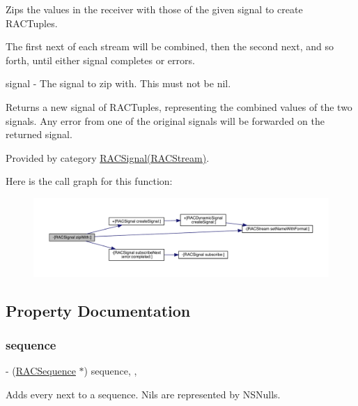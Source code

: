Zips the values in the receiver with those of the given signal to create R\+A\+C\+Tuples.

The first {\ttfamily next} of each stream will be combined, then the second {\ttfamily next}, and so forth, until either signal completes or errors.

signal -\/ The signal to zip with. This must not be {\ttfamily nil}.

Returns a new signal of R\+A\+C\+Tuples, representing the combined values of the two signals. Any error from one of the original signals will be forwarded on the returned signal. 

Provided by category \mbox{\hyperlink{category_r_a_c_signal_07_r_a_c_stream_08_ac822f657df311327de76bc55bcae689d}{R\+A\+C\+Signal(\+R\+A\+C\+Stream)}}.

Here is the call graph for this function\+:\nopagebreak
\begin{figure}[H]
\begin{center}
\leavevmode
\includegraphics[width=350pt]{interface_r_a_c_signal_ac822f657df311327de76bc55bcae689d_cgraph}
\end{center}
\end{figure}


\subsection{Property Documentation}
\mbox{\label{interface_r_a_c_signal_ae580a10328d7f204c456068a2bfb5e1b}} 
\subsubsection{\texorpdfstring{sequence}{sequence}}
{\footnotesize\ttfamily -\/ (\mbox{\hyperlink{interface_r_a_c_sequence}{R\+A\+C\+Sequence}} $\ast$) sequence\hspace{0.3cm}{\ttfamily [read]}, {\ttfamily [nonatomic]}, {\ttfamily [strong]}}

Adds every {\ttfamily next} to a sequence. Nils are represented by N\+S\+Nulls.

